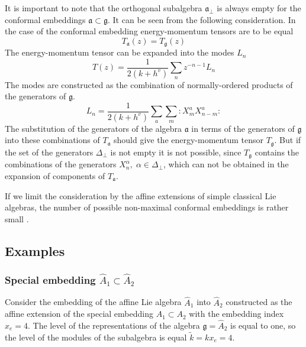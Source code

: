 \documentclass[a4paper,12pt]{article}
\theoremstyle{definition} \newtheorem{Def}{Definition}
\begin{document}
It is important to note that the orthogonal subalgebra $\mathfrak{a}_{\bot}$ is always empty for the conformal embeddings $\mathfrak{a}\subset \mathfrak{g}$. It can be seen from the following consideration. In the case of the conformal embedding energy-momentum tensors are to be equal
\begin{equation}
  \label{eq:46}
  T_{\mathfrak{a}}(z)=T_{\mathfrak{g}}(z)
\end{equation}
The energy-momentum tensor can be expanded into the modes $L_n$
\begin{equation}
\label{eq:47}
  T(z)=\frac{1}{2(k+h^v)}\sum_n z^{-n-1}L_n
\end{equation}
The modes are constructed as the combination of normally-ordered products of the generators of $\mathfrak{g}$.
\begin{equation}
\label{eq:48}
  L_n=\frac{1}{2(k+h^v)}\sum_a\sum_m:X^a_m X^a_{n-m}:
\end{equation}
The substitution of the generators of the algebra $\mathfrak{a}$  in terms of the generators of $\mathfrak{g}$ into these combinations of $T_{\mathfrak{a}}$ should give the energy-momentum tensor $T_{\mathfrak{g}}$. But if the set of the generators $\Delta_{\bot}$ is not empty it is not possible, since $T_{\mathfrak{g}}$ contains the combinations of the generators $X^{\alpha}_n, \; \alpha\in \Delta_{\bot}$, which can not be obtained in the expansion of components of $T_{\mathfrak{a}}$.

If we limit the consideration by the affine extensions of simple classical Lie algebras, the number of possible non-maximal conformal embeddings is rather small \cite{schellekens1986conformal}.

\subsection{Examples}
\label{sec:example}

\subsubsection{Special embedding $\hat{A}_1\subset\hat{A}_2$}
\label{sec:spec-embedd-hata_1s}
Consider the embedding of the affine Lie algebra $\hat{A}_1$ into $\hat{A}_2$ constructed as the affine extension of the special embedding $A_1\subset A_2$ with the embedding index $x_e=4$. The level of the representations of the algebra $\mathfrak{g}=\hat{A}_2$ is equal to one, so the level of the modules of the subalgebra is equal $\tilde{k}=kx_e=4$.
\end{document}
